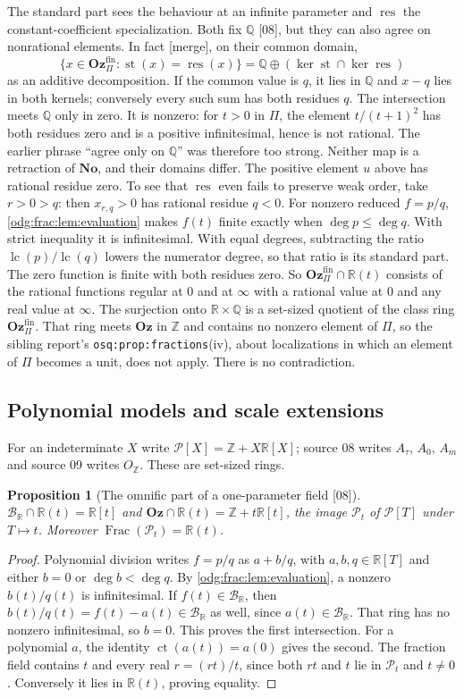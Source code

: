 \documentclass[11pt,oneside]{article}
\numberwithin{equation}{section}
\newtheorem{proposition}[proposition]{Proposition}
\theoremstyle{definition}
\theoremstyle{remark}
\newcommand{\No}{\mathbf{No}}
\newcommand{\Oz}{\mathbf{Oz}}
\newcommand{\Z}{\mathbb Z}
\newcommand{\Q}{\mathbb Q}
\newcommand{\R}{\mathbb R}
\newcommand{\BR}{\mathcal B_{\R}}
\newcommand{\ct}{\operatorname{ct}}
\newcommand{\lc}{\operatorname{lc}}
\newcommand{\Frac}{\operatorname{Frac}}
\newcommand{\src}[1]{\textup{\textsf{\small[#1]}}}
\newcommand{\mergetag}{\textup{\textsf{\small[merge]}}}
\newcommand{\replabel}[1]{\nolinkurl{#1}}
\newcommand{\st}{\operatorname{st}}
\newcommand{\res}{\operatorname{res}}
\newcommand{\Pmod}{\mathcal P}
\begin{document}
The standard part sees the behaviour at an infinite parameter and $\res$ the
constant-coefficient specialization. Both fix $\Q$ \src{08}, but they can
also agree on nonrational elements. In fact \mergetag, on their common domain,
\[
 \{x\in\Oz_\Pi^{\mathrm{fin}}:\st(x)=\res(x)\}
   =\Q\oplus(\ker\st\cap\ker\res)
\]
as an additive decomposition. If the common value is $q$, it lies in $\Q$
and $x-q$ lies in both kernels; conversely every such sum has both residues
$q$. The intersection meets $\Q$ only in zero. It is nonzero: for $t>0$ in
$\Pi$, the element $t/(t+1)^2$ has both residues zero and is a positive
infinitesimal, hence is not rational. The earlier phrase ``agree only on
$\Q$'' was therefore too strong.
Neither map is a retraction of $\No$, and their domains differ.
The positive element $u$ above has rational residue zero. To see that
$\res$ even fails to preserve weak order, take $r>0>q$: then $x_{r,q}>0$
has rational residue $q<0$. For nonzero reduced $f=p/q$,
\cref{odg:frac:lem:evaluation} makes $f(t)$ finite exactly when
$\deg p\le\deg q$. With strict inequality it is infinitesimal. With equal
degrees, subtracting the ratio $\lc(p)/\lc(q)$ lowers the numerator degree,
so that ratio is its standard part. The zero function is finite with both
residues zero. So $\Oz_\Pi^{\mathrm{fin}}\cap\R(t)$ consists of the
rational functions regular at $0$ and at $\infty$ with a rational value at $0$
and any real value at $\infty$. The surjection onto $\R\times\Q$ is a set-sized
quotient of the class ring $\Oz_\Pi^{\mathrm{fin}}$. That ring meets $\Oz$ in $\Z$
and contains no nonzero element of $\Pi$, so the sibling report's
\replabel{osq:prop:fractions}(iv), about localizations in which an element of
$\Pi$ becomes a unit, does not apply. There is no contradiction.

\subsection{Polynomial models and scale extensions}\label{odg:frac:sub:models}

For an indeterminate $X$ write $\Pmod[X]=\Z+X\R[X]$; source 08 writes $A_\tau$,
$A_0$, $A_m$ and source 09 writes $O_\Z$. These are set-sized rings.

\begin{proposition}[The omnific part of a one-parameter field \src{08}]\label{odg:frac:prop:intersection}
$\BR\cap\R(t)=\R[t]$ and $\Oz\cap\R(t)=\Z+t\R[t]$, the image $\Pmod_t$ of
$\Pmod[T]$ under $T\mapsto t$. Moreover $\Frac(\Pmod_t)=\R(t)$.
\end{proposition}
\begin{proof}
Polynomial division writes $f=p/q$ as $a+b/q$, with $a,b,q\in\R[T]$
and either $b=0$ or $\deg b<\deg q$. By \cref{odg:frac:lem:evaluation},
a nonzero $b(t)/q(t)$ is infinitesimal. If $f(t)\in\BR$, then
$b(t)/q(t)=f(t)-a(t)\in\BR$ as well, since $a(t)\in\BR$. That ring has
no nonzero infinitesimal, so $b=0$. This proves the first intersection.
For a polynomial $a$, the identity $\ct(a(t))=a(0)$ gives the second.
The fraction field contains $t$ and every real $r=(rt)/t$, since both
$rt$ and $t$ lie in $\Pmod_t$ and $t\ne0$. Conversely it lies in
$\R(t)$, proving equality.
\end{proof}
\end{document}
